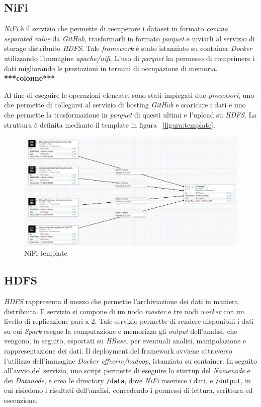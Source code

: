 \documentclass[conference]{IEEEtran}
\begin{document}
\subsection*{\textbf{NiFi}}
\emph{NiFi} \`{e} il servizio che permette di recuperare i dataset in formato \emph{comma separated value} da \emph{GitHub}, trasformarli in formato \emph{parquet} e inviarli al servizio di storage distribuito \emph{HDFS}. Tale \emph{framework} \`{e} stato istanziato su container \emph{Docker} utilizzando l'immagine \emph{apache/nifi}.
L'uso di \emph{parquet} ha permesso di comprimere i dati migliorando le prestazioni in termini di occupazione di memoria. \textbf{***colonne***}
\par Al fine di eseguire le operazioni elencate, sono stati impiegati due \emph{processori}, uno che permette di collegarsi al servizio di hosting \emph{GitHub} e scaricare i dati e uno che permette la trasformazione in \emph{parquet} di questi ultimi e l'upload su \emph{HDFS}. La struttura \`{e} definita mediante il template in figura ~\ref{figura:template}.
\begin{figure}[htbp]
\includegraphics[scale=0.19]{NiFi_template.png}
\caption{NiFi template}\label{figura:template}
\label{fig}
\end{figure}

\subsection*{\textbf{HDFS}}
\emph{HDFS} rappresenta il mezzo che permette l'archiviazione dei dati in maniera distribuita. Il servizio si compone di un nodo \emph{master} e tre nodi \emph{worker} con un livello di replicazione pari a 2. Tale servizio permette di rendere disponibili i dati su cui \emph{Spark} esegue la computazione e memorizza gli \emph{output} dell'analisi, che vengono, in seguito, esportati su \emph{HBase}, per eventuali analisi, manipolazione e rappresentazione dei dati. Il deployment del framework avviene attraverso l'utilizzo dell'immagine \emph{Docker} \emph{effeerre/hadoop}, istanziata su container. In seguito all'avvio del servizio, uno script permette di eseguire lo sturtup del \emph{Namenode} e dei \emph{Datanode}, e crea le directory \texttt{/data}, dove \emph{NiFi} inserisce i dati, e \texttt{/output}, in cui risiedono i risultati dell'analisi, concedendo i permessi di lettura, scrittura ed esecuzione.
\end{document}

